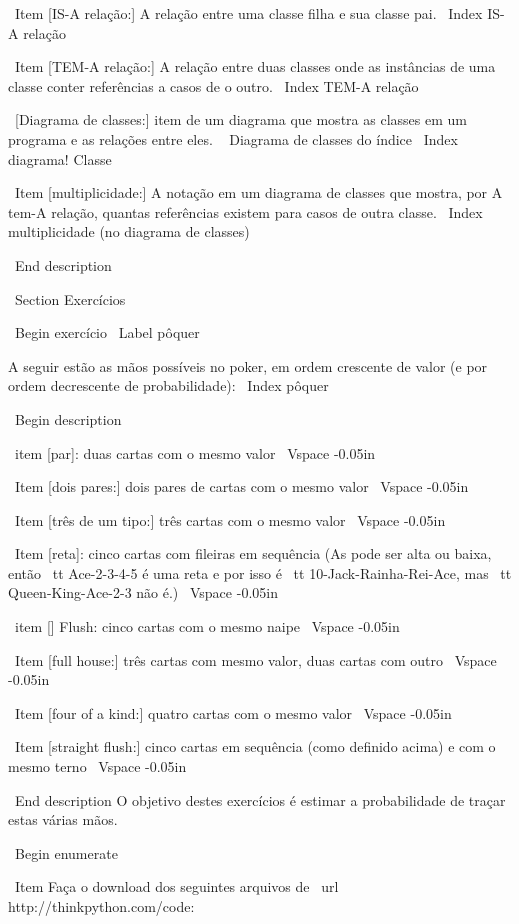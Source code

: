 \documentclass[10pt]{book}
\begin{document}
{{{{{{{{{{{{{{{{{\ Item [IS-A relação:] A relação entre uma classe filha
e sua classe pai.
\ Index {IS-A relação}

\ Item [TEM-A relação:] A relação entre duas classes
onde as instâncias de uma classe conter referências a casos de
o outro.
\ Index {TEM-A relação}

\ [Diagrama de classes:] item de um diagrama que mostra as classes em um programa
e as relações entre eles.
\ {} Diagrama de classes do índice
\ Index {diagrama! Classe}

\ Item [multiplicidade:] A notação em um diagrama de classes que mostra, por
A tem-A relação, quantas referências existem para casos
de outra classe.
\ Index {multiplicidade (no diagrama de classes)}

\ End {description}


\ Section {Exercícios}

\ Begin {} exercício
\ Label {} pôquer

A seguir estão as mãos possíveis no poker, em ordem crescente
de valor (e por ordem decrescente de probabilidade):
\ Index {} pôquer

\ Begin {description}

\ item [par]: duas cartas com o mesmo valor
\ Vspace {-0.05in}

\ Item [dois pares:] dois pares de cartas com o mesmo valor
\ Vspace {-0.05in}

\ Item [três de um tipo:] três cartas com o mesmo valor
\ Vspace {-0.05in}

\ Item [reta]: cinco cartas com fileiras em sequência (As pode
ser alta ou baixa, então {\ tt Ace-2-3-4-5} é uma reta e por isso é {\ tt
10-Jack-Rainha-Rei-Ace}, mas {\ tt Queen-King-Ace-2-3} não é.)
\ Vspace {-0.05in}

\ item [] Flush: cinco cartas com o mesmo naipe
\ Vspace {-0.05in}

\ Item [full house:] três cartas com mesmo valor, duas cartas com outro
\ Vspace {-0.05in}

\ Item [four of a kind:] quatro cartas com o mesmo valor
\ Vspace {-0.05in}

\ Item [straight flush:] cinco cartas em sequência (como definido acima) e
com o mesmo terno
\ Vspace {-0.05in}

\ End {description}
%
O objetivo destes exercícios é estimar
a probabilidade de traçar estas várias mãos.

\ Begin {enumerate}

\ Item Faça o download dos seguintes arquivos de \ url {http://thinkpython.com/code}:

}}}}}}}}}}}}}}}}}
\end{document}
